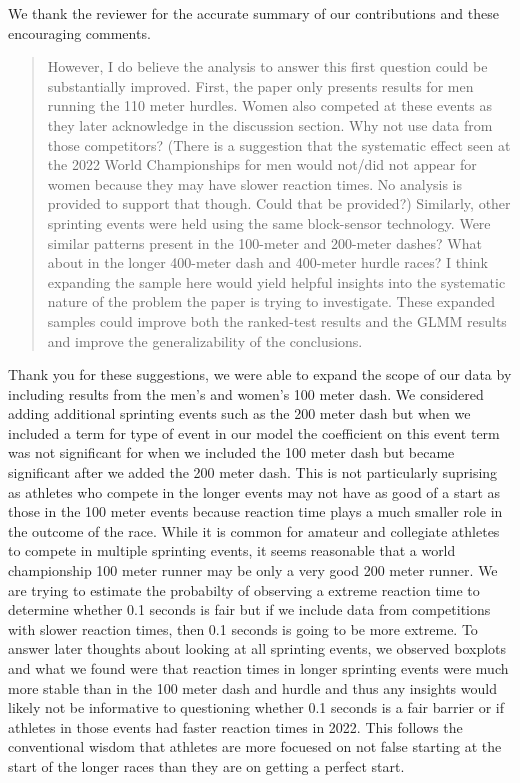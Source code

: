 \documentclass[12pt]{article}
\newenvironment{comment}%
{\begin{quotation}\noindent\small\it\color{darkblue}\ignorespaces%
}{\end{quotation}}
\begin{document}
We thank the reviewer for the accurate summary of our contributions
and these encouraging comments.  


\begin{comment}
However, I do believe the analysis to answer this first question could be
substantially improved. First, the paper only presents results for men running
the 110 meter hurdles. Women also competed at these events as they later
acknowledge in the discussion section. Why not use data from those competitors?
(There is a suggestion that the systematic effect seen at the 2022 World
Championships for men would not/did not appear for women because they may have
slower reaction times. No analysis is provided to support that though. Could
that be provided?) Similarly, other sprinting events were held using the same
block-sensor technology. Were similar patterns present in the 100-meter and
200-meter dashes? What about in the longer 400-meter dash and 400-meter hurdle
races? I think expanding the sample here would yield helpful insights into the
systematic nature of the problem the paper is trying to investigate. These
expanded samples could improve both the ranked-test results and the GLMM results
and improve the generalizability of the conclusions.
\end{comment}


Thank you for these suggestions, we were able to expand the scope of our data
by including results from the men's and women's 100 meter dash.  We considered
adding additional sprinting events such as the 200 meter dash but
when we included a term for type of event in our model the coefficient on this
event term was not significant for when we included the 100 meter dash
but became significant after we added the 200 meter dash.
This is not particularly suprising as athletes who compete in the longer
events may not have as good of a start as those in the 100
meter events because reaction time plays a much smaller role in the outcome of
the race. While it is common for amateur and collegiate athletes to compete in
multiple sprinting events, it seems reasonable that a world championship 100
meter runner may be only a very good 200 meter runner.  We are trying to
estimate the probabilty of observing a extreme reaction time to determine
whether 0.1 seconds is fair but if we include data from competitions with slower
reaction times, then 0.1 seconds is going to be more extreme.  To answer later
thoughts about looking at all sprinting events, we observed boxplots and what we
found were that reaction times in longer sprinting events were much more stable
than in the 100 meter dash and hurdle and thus any insights would likely not be
informative to questioning whether 0.1 seconds is a fair barrier or if athletes
in those events had faster reaction times in 2022.  This follows the conventional
wisdom that athletes are more focuesed on not false starting at the start of the
longer races than they are on getting a perfect start.
\end{document}
